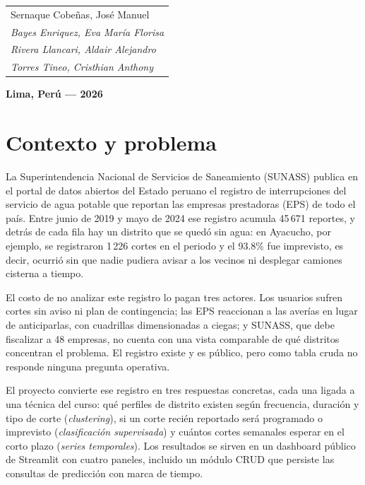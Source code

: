 \documentclass[11pt,a4paper]{article}
\begin{document}
\begin{center}
      \vspace{0.3cm}

      \begin{tabular}{l}
            Sernaque Cobe\~nas, Jos\'e Manuel            \\
            \textit{Bayes Enriquez, Eva Mar\'ia Florisa} \\
            \textit{Rivera Llancari, Aldair Alejandro}   \\
            \textit{Torres Tineo, Cristhian Anthony}     \\
      \end{tabular}

      \vfill

      {\bfseries Lima, Per\'u --- 2026}

      \vspace{0.5cm}
\end{center}

\clearpage
\setcounter{page}{1}

\section{Contexto y problema}

La Superintendencia Nacional de Servicios de Saneamiento (SUNASS) publica en el
portal de datos abiertos del Estado peruano el registro de interrupciones del
servicio de agua potable que reportan las empresas prestadoras (EPS) de todo el
país. Entre junio de 2019 y mayo de 2024 ese registro acumula 45\,671 reportes,
y detrás de cada fila hay un distrito que se quedó sin agua: en Ayacucho, por
ejemplo, se registraron 1\,226 cortes en el periodo y el 93.8\% fue imprevisto,
es decir, ocurrió sin que nadie pudiera avisar a los vecinos ni desplegar
camiones cisterna a tiempo.

El costo de no analizar este registro lo pagan tres actores. Los usuarios sufren
cortes sin aviso ni plan de contingencia; las EPS reaccionan a las averías en
lugar de anticiparlas, con cuadrillas dimensionadas a ciegas; y SUNASS, que debe
fiscalizar a 48 empresas, no cuenta con una vista comparable de qué distritos
concentran el problema. El registro existe y es público, pero como tabla cruda
no responde ninguna pregunta operativa.

El proyecto convierte ese registro en tres respuestas concretas, cada una ligada
a una técnica del curso: qué perfiles de distrito existen según frecuencia,
duración y tipo de corte (\emph{clustering}), si un corte recién reportado será
programado o imprevisto (\emph{clasificación supervisada}) y cuántos cortes
semanales esperar en el corto plazo (\emph{series temporales}). Los resultados
se sirven en un dashboard público de Streamlit con cuatro paneles, incluido un
módulo CRUD que persiste las consultas de predicción con marca de tiempo.
\end{document}
